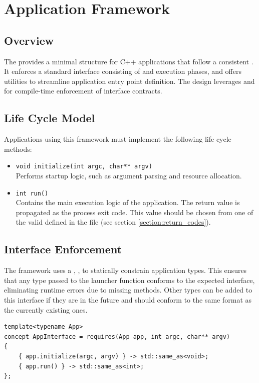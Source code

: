 \section{Application Framework}\label{section:app_framework}

\subsection{Overview}

The  provides a minimal structure for C++ applications that follow a consistent . It enforces a standard interface consisting of  and execution phases, and offers utilities to streamline application entry point definition. The design leverages   and  for compile-time enforcement of interface contracts.

\subsection{Life Cycle Model}
Applications using this framework must implement the following life cycle methods:
\begin{itemize}\itemsep0em
	\item \texttt{void initialize(int argc, char** argv)} \\
	Performs startup logic, such as argument parsing and resource allocation.
	\item \texttt{int run()} \\
	Contains the main execution logic of the application. The return value is propagated as the process exit code. This value should be chosen from one of the valid  defined in the  file (see section \ref{section:return_codes}).
\end{itemize}

\subsection{Interface Enforcement}
The framework uses a  , , to statically constrain application types. This ensures that any type passed to the launcher function conforms to the expected interface, eliminating runtime errors due to missing methods. Other types can be added to this interface if they are in the future and should conform to the same format as the currently existing ones. 
\begin{lstlisting}[style=cppstyle]
template<typename App>
concept AppInterface = requires(App app, int argc, char** argv) 
{
    { app.initialize(argc, argv) } -> std::same_as<void>;
    { app.run() } -> std::same_as<int>;
};
\end{lstlisting}

